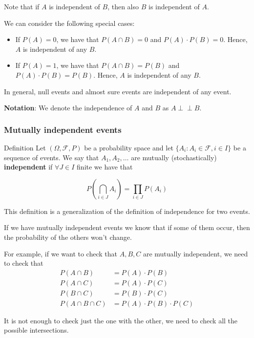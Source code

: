 \documentclass[10pt]{extarticle}
\newcommand{\F}{\mathcal{F}}
\newcommand{\indep}{\perp \!\!\! \perp}
\begin{document}
Note that if $A$ is independent of $B$, then also $B$ is independent of $A$.

We can consider the following special cases:
\begin{itemize}
    \item If $P(A) = 0$, we have that $P(A \cap B) = 0$ and $P(A) \cdot P(B) = 0$.
          Hence, $A$ is independent of any $B$.
    \item If $P(A) = 1$, we have that $P(A \cap B) = P(B)$ and $P(A) \cdot P(B) = P(B)$.
          Hence, $A$ is independent of any $B$.
\end{itemize}

In general, null events and almost sure events are independent of any event.

\textbf{Notation}: We denote the independence of $A$ and $B$ as $A \indep B$.

\subsubsection{Mutually independent events}

\begin{bluebox}{Definition}
    Let $(\Omega, \F, P)$ be a probability space and let $\{A_i : A_i \in \F, i \in I\}$ be a sequence of events.
    We say that $A_1, A_2, \dots$ are mutually (stochastically) \textbf{independent} if
    $\forall J \in I$ finite we have that

    $$
        P\left(\bigcap_{i \in J} A_i\right) = \prod_{i \in J} P(A_i)
    $$

\end{bluebox}

This definition is a generalization of the definition of independence for two events.

If we have mutually independent events we know that if some of them occur, then the probability of the others won't change.

For example, if we want to check that $A, B, C$ are mutually independent, we need to check that
\begin{align*}
    P(A \cap B)        & = P(A) \cdot P(B)            \\
    P(A \cap C)        & = P(A) \cdot P(C)            \\
    P(B \cap C)        & = P(B) \cdot P(C)            \\
    P(A \cap B \cap C) & = P(A) \cdot P(B) \cdot P(C)
\end{align*}

It is not enough to check just the one with the other, we need to check all the possible intersections.
\end{document}
